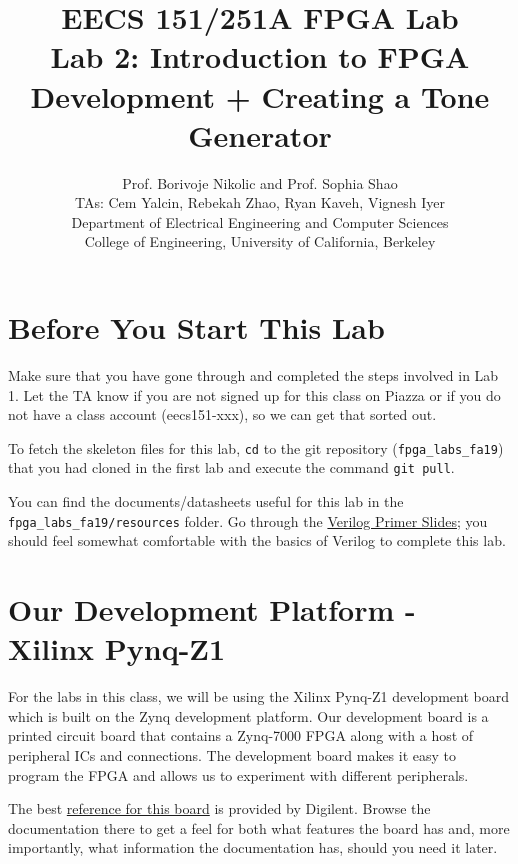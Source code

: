 \documentclass[11pt]{article}
\newcommand{\repo}{fpga\_labs\_fa19}
\begin{document}
\title{EECS 151/251A FPGA Lab\\
Lab 2: Introduction to FPGA Development + Creating a Tone Generator}

\author{Prof. Borivoje Nikolic and Prof. Sophia Shao \\
TAs: Cem Yalcin, Rebekah Zhao, Ryan Kaveh, Vignesh Iyer \\ Department of Electrical Engineering and Computer Sciences\\
College of Engineering, University of California, Berkeley}

\date{}
\maketitle

\section{Before You Start This Lab}

Make sure that you have gone through and completed the steps involved in Lab 1.
Let the TA know if you are not signed up for this class on Piazza or if you do not have a class account (eecs151-xxx), so we can get that sorted out.

To fetch the skeleton files for this lab, \texttt{cd} to the git repository (\texttt{\repo}) that you had cloned in the first lab and execute the command \texttt{git pull}.

You can find the documents/datasheets useful for this lab in the \texttt{\repo/resources} folder.
Go through the \href{http://inst.eecs.berkeley.edu/~eecs151/fa19/files/verilog/Verilog_Primer_Slides.pdf}{Verilog Primer Slides}; you should feel somewhat comfortable with the basics of Verilog to complete this lab.

\section{Our Development Platform - Xilinx Pynq-Z1}
For the labs in this class, we will be using the Xilinx Pynq-Z1 development board which is built on the Zynq development platform. Our development board is a printed circuit board that contains a Zynq-7000 FPGA along with a host of peripheral ICs and connections. The development board makes it easy to program the FPGA and allows us to experiment with different peripherals.

The best \href{https://reference.digilentinc.com/reference/programmable-logic/pynq-z1/reference-manual}{reference for this board} is provided by Digilent.
Browse the documentation there to get a feel for both what features the board has and, more importantly, what information the documentation has, should you need it later.
\end{document}
